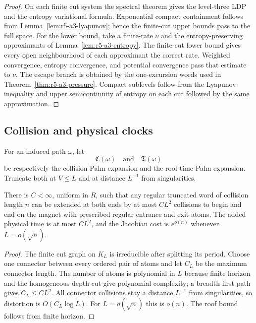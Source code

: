 \begin{proof}
On each finite cut system the spectral theorem gives the level-three LDP and
the entropy variational formula.  Exponential compact containment follows
from Lemma~\ref{lem:r5-a3-lyapunov}; hence the finite-cut upper bounds pass to
the full space.  For the lower bound, take a finite-rate \(\nu\) and the
entropy-preserving approximants of
Lemma~\ref{lem:r5-a3-entropy}.  The finite-cut lower bound gives every open
neighbourhood of each approximant the correct rate.  Weighted convergence,
entropy convergence, and potential convergence pass that estimate to \(\nu\).
The escape branch is obtained by the one-excursion words used in
Theorem~\ref{thm:r5-a3-pressure}.  Compact sublevels follow from the
Lyapunov inequality and upper semicontinuity of entropy on each cut followed
by the same approximation.
\end{proof}

\subsection{Collision and physical clocks}

For an induced path \(\omega\), let
\[
 {\mathfrak C}(\omega)
 \quad\text{and}\quad
 {\mathfrak T}(\omega)
\]
be respectively the collision Palm expansion and the roof-time Palm
expansion.  Truncate both at \(V\le L\) and at distance \(L^{-1}\) from
singularities.

\begin{lemma}
\label{lem:r5-a3-surgery}
There is \(C<\infty\), uniform in \(R\), such that any regular truncated word
of collision length \(n\) can be extended at both ends by at most \(CL^2\)
collisions to begin and end on the magnet with prescribed regular entrance
and exit atoms.  The added physical time is at most \(CL^2\), and the
Jacobian cost is \(e^{o(n)}\) whenever \(L=o(\sqrt n)\).
\end{lemma}

\begin{proof}
The finite cut graph on \(K_L\) is irreducible after splitting its period.
Choose one connector between every ordered pair of atoms and let \(C_L\) be
the maximum connector length.  The number of atoms is polynomial in \(L\)
because finite horizon and the homogeneous depth cut give polynomial
complexity; a breadth-first path gives \(C_L\le CL^2\).  All connector
collisions stay a distance \(L^{-1}\) from singularities, so distortion is
\(O(C_L\log L)\).  For \(L=o(\sqrt n)\) this is \(o(n)\).  The roof bound
follows from finite horizon.
\end{proof}

